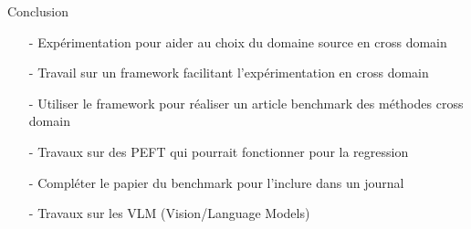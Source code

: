 \begin{subsectionframemod}{Conclusion}
\begin{itemize}
    \item[-]  Expérimentation pour aider au choix du domaine source en cross domain\\\hfill{}
    \item[-]  Travail sur un framework facilitant l'expérimentation en cross domain\\\hfill{}
    \item[-]  Utiliser le framework pour réaliser un article benchmark des méthodes cross domain\\\hfill{}
    \item[-]  Travaux sur des PEFT qui pourrait fonctionner pour la regression\\\hfill{}
    \item[-]  Compléter le papier du benchmark pour l'inclure dans un journal\\\hfill{}
    \item[-]  Travaux sur les VLM (Vision/Language Models)\\\hfill{}
\end{itemize}


\end{subsectionframemod}
